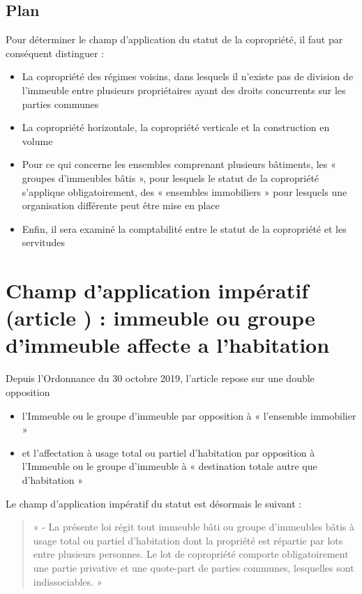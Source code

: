 	\subsection*{Plan}
		Pour déterminer le champ d’application du statut de la copropriété, il faut par conséquent distinguer :
		\begin{itemize}
			\item La copropriété des régimes voisins, dans lesquels il n’existe pas de division de
			l’immeuble entre plusieurs propriétaires ayant des droits concurrents sur les parties
			communes %
			\item La copropriété horizontale, la copropriété verticale et la construction en volume
			\item Pour ce qui concerne les ensembles comprenant plusieurs bâtiments, les « groupes
			d’immeubles bâtis », pour lesquels le statut de la copropriété s’applique
			obligatoirement, des « ensembles immobiliers » pour lesquels une organisation
			différente peut être mise en place %
			\item Enfin, il sera examiné la comptabilité entre le statut de la copropriété et les
			servitudes %
		\end{itemize}

\section{Champ d’application impératif (article \II) : immeuble ou groupe d’immeuble affecte a l’habitation}
	Depuis l’Ordonnance du 30 octobre 2019, l’article \I{} repose sur une double opposition
	\begin{itemize}
		\item l’Immeuble ou le groupe d’immeuble par opposition à « l’ensemble immobilier »
		\item et l’affectation à usage total ou partiel d’habitation par opposition à l’Immeuble ou le
		groupe d’immeuble à « destination totale autre que d’habitation »
	\end{itemize}
	
	Le champ d’application impératif du statut est désormais le suivant :
	\begin{quote}
		« \I{} - La présente loi régit tout immeuble bâti ou groupe d’immeubles bâtis à usage total ou partiel
		d’habitation dont la propriété est répartie par lots entre plusieurs personnes.
		Le lot de copropriété comporte obligatoirement une partie privative et une quote-part de parties
		communes, lesquelles sont indissociables. »
	\end{quote}
	
